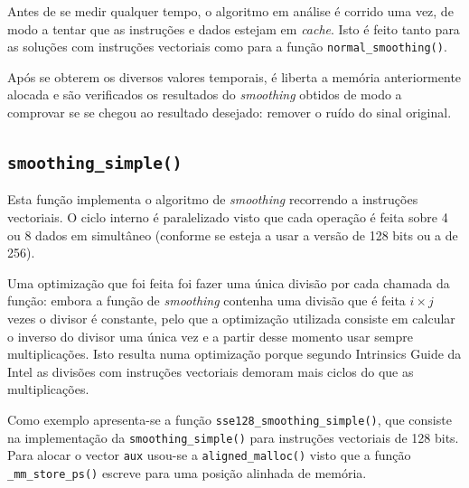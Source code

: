 \documentclass[a4paper]{article}
\begin{document}
	
	Antes de se medir qualquer tempo, o algoritmo em análise é corrido uma vez, de modo a tentar que as instruções e dados estejam em \textit{cache}. Isto é feito tanto para as soluções com instruções vectoriais como para a função \texttt{normal\_smoothing()}.
		
	Após se obterem os diversos valores temporais, é liberta a memória anteriormente alocada e são verificados os resultados do \textit{smoothing} obtidos de modo a comprovar se se chegou ao resultado desejado: remover o ruído do sinal original.
	
	\subsection{\texttt{smoothing\_simple()}}
	
	Esta função implementa o algoritmo de \textit{smoothing} recorrendo a instruções vectoriais. O ciclo interno é paralelizado visto que cada operação é feita sobre 4 ou 8 dados em simultâneo (conforme se esteja a usar a versão de 128 bits ou a de 256).
	
	Uma optimização que foi feita foi fazer uma única divisão por cada chamada da função: embora a função de \textit{smoothing} contenha uma divisão que é feita $i \times j$ vezes o divisor é constante, pelo que a optimização utilizada consiste em calcular o inverso do divisor uma única vez e a partir desse momento usar sempre multiplicações. Isto resulta numa optimização porque segundo Intrinsics Guide da Intel as divisões com instruções vectoriais demoram mais ciclos do que as multiplicações.
	
	Como exemplo apresenta-se a função \texttt{sse128\_smoothing\_simple()}, que consiste na implementação da \texttt{smoothing\_simple()} para instruções vectoriais de 128 bits. Para alocar o vector \texttt{aux} usou-se a \texttt{aligned\_malloc()} visto que a função \texttt{\_mm\_store\_ps()} escreve para uma posição alinhada de memória.
	
\end{document}
